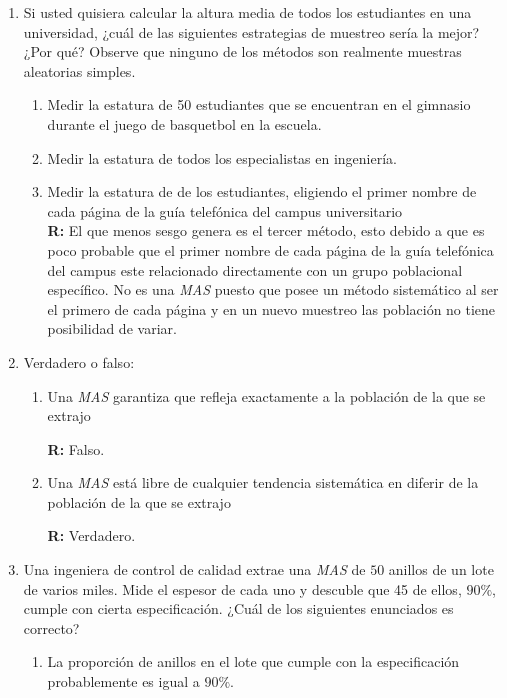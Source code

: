 \documentclass[10pt,a4paper]{book}
\begin{document}
\begin{enumerate}
	\item Si usted quisiera calcular la altura media de todos los estudiantes en una universidad, ¿cuál de las siguientes estrategias de muestreo sería la mejor? ¿Por qué? Observe que ninguno de los métodos son realmente muestras aleatorias simples.
	
	\begin{enumerate}
		\item Medir la estatura de 50 estudiantes que se encuentran en el gimnasio durante el juego de basquetbol en la escuela.
		\item Medir la estatura de todos los especialistas en ingeniería.
		\item Medir la estatura de de los estudiantes, eligiendo el primer nombre de cada página de la guía telefónica del campus universitario\\
		
		\textbf{R:} El que menos sesgo genera es el tercer método, esto debido a que es poco probable que el primer nombre de cada página de la guía telefónica del campus este relacionado directamente con un grupo poblacional específico. No es una \textit{MAS} puesto que posee un método sistemático al ser el primero de cada página y en un nuevo muestreo las población no tiene posibilidad de variar.
	\end{enumerate}
	
	\item Verdadero o falso:
	\begin{enumerate}
		\item Una \textit{MAS} garantiza que refleja exactamente a la población de la que se extrajo
		
		\textbf{R:} Falso.\\
		
		\item Una \textit{MAS} está libre de cualquier tendencia sistemática en diferir de la población de la que se extrajo
		
		\textbf{R:} Verdadero.
	\end{enumerate}
	
	\item Una ingeniera de control de calidad extrae una \textit{MAS} de $ 50 $ anillos de un lote de varios miles. Mide el espesor de cada uno y descuble que 45 de ellos, $ 90\% $, cumple con cierta especificación. ¿Cuál de los siguientes enunciados es correcto?
	
	\begin{enumerate}
		\item La proporción de anillos en el lote que cumple con la especificación probablemente es igual a $ 90\% $.
		

\end{enumerate}
\end{enumerate}
\end{document}
